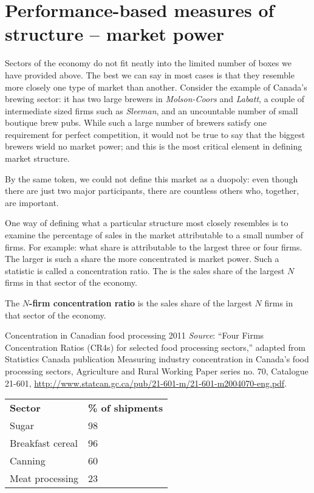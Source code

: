 \section{Performance-based measures of structure -- market power}\label{sec:ch11sec2}

Sectors of the economy do not fit neatly into the limited number of boxes we have provided above. The best we can say in most cases is that they resemble more closely one type of market than another. Consider the example of Canada's brewing sector: it has two large brewers in \textit{Molson-Coors} and \textit{Labatt}, a couple of intermediate sized firms such as \textit{Sleeman}, and an uncountable number of small boutique brew pubs. While such a large number of brewers satisfy one requirement for perfect competition, it would not be true to say that the biggest brewers wield no market power; and this is the most critical element in defining market structure.

By the same token, we could not define this market as a duopoly: even though there are just two major participants, there are countless others who, together, are important.

One way of defining what a particular structure most closely resembles is to examine the percentage of sales in the market attributable to a small number of firms. For example: what share is attributable to the largest three or four firms. The larger is such a share the more concentrated is market power. Such a statistic is called a concentration ratio. The  is the sales share of the largest $N$ firms in that sector of the economy.

\begin{DefBox}
The \textbf{$N$-firm concentration ratio} is the sales share of the largest $N$ firms in that sector of the economy.
\end{DefBox}

\begin{Table}{25em}{Concentration in Canadian food processing 2011 \label{table:canfoodpro}}{\textit{Source}: ``Four Firms Concentration Ratios (CR4s) for selected food processing sectors,'' adapted from Statistics Canada publication Measuring industry concentration in Canada's food processing sectors, Agriculture and Rural Working Paper series no. 70, Catalogue 21-601, \href{http://www.statcan.gc.ca/pub/21-601-m/21-601-m2004070-eng.pdf}{http://www.statcan.gc.ca/pub/21-601-m/21-601-m2004070-eng.pdf}.}
\begin{tabu} to 30em {|X[1,c]X[1,c]|} \hline 
{}	\textbf{Sector}		& \textbf{\% of shipments}	\\
						Sugar				& 98						\\
	Breakfast cereal	& 96						\\ 
						Canning				& 60						\\
	Meat processing		& 23						\\ \hline 
\end{tabu}
\end{Table}

